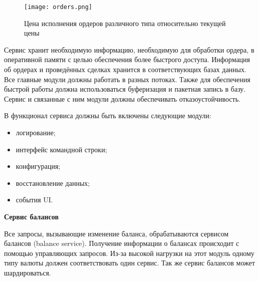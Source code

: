 \begin{figure}[ht]
    \centering
    \texttt{[image: orders.png]}
    \caption{Цена исполнения ордеров различного типа относительно текущей цены}\label{fig:orders_type}
\end{figure}

Сервис хранит необходимую информацию, необходимую для обработки ордера, в оперативной памяти с целью обеспечения более быстрого доступа. Информация об ордерах и проведённых сделках хранится в соответствующих базах данных. Все главные модули должны работать в разных потоках. Также для обеспечения быстрой работы должна использоваться буферизация и пакетная запись в базу. Сервис и связанные с ним модули должны обеспечивать отказоустойчивость.

В функционал сервиса должны быть включены следующие модули:
\begin{itemize}
    \item логирование;
    \item интерфейс командной строки;
    \item конфигурация;
    \item восстановление данных;
    \item события UI.
\end{itemize}


\textbf{Сервис балансов}

Все запросы, вызывающие изменение баланса, обрабатываются сервисом балансов (balance service). Получение информации о балансах происходит с помощью управляющих запросов. Из-за высокой нагрузки на этот модуль одному типу валюты должен соответствовать один сервис. Так же сервис балансов может шардироваться.

